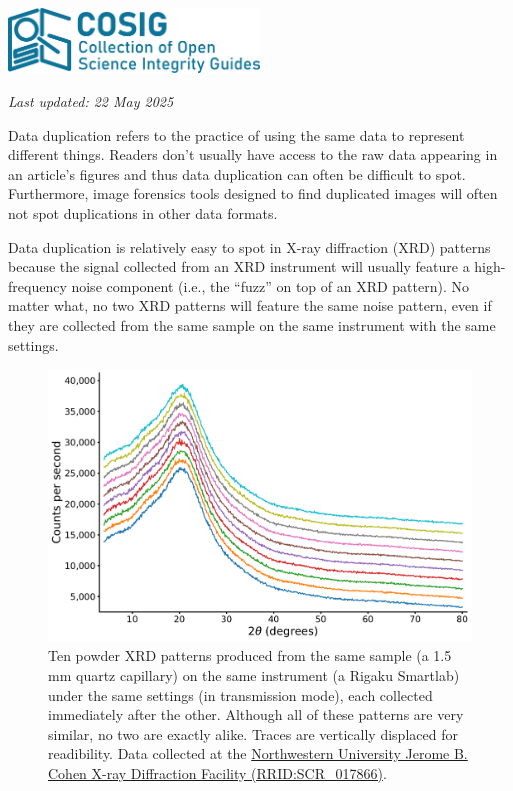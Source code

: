 \documentclass[letterpaper, 12pt]{article}
\begin{document}
\flushleft\includegraphics[width=0.5\textwidth]{img/home/241017_final_logo_mockup.png}

\textit{Last updated: 22 May 2025}

Data duplication refers to the practice of using the same data to represent different things. Readers don't usually have access to the raw data appearing in an article's figures and thus data duplication can often be difficult to spot. Furthermore, image forensics tools designed to find duplicated images will often not spot duplications in other data formats.

Data duplication is relatively easy to spot in X-ray diffraction (XRD) patterns because the signal collected from an XRD instrument will usually feature a high-frequency noise component (i.e., the ``fuzz'' on top of an XRD pattern). No matter what, no two XRD patterns will feature the same noise pattern, even if they are collected from the same sample on the same instrument with the same settings.

\begin{figure}[h!tbp]
    \centering
    \includegraphics[width=\textwidth]{img/xrd_data_duplication/250519_xrd_x10.pdf}
    \caption*{Ten powder XRD patterns produced from the same sample (a 1.5 mm quartz capillary) on the same instrument (a Rigaku Smartlab) under the same settings (in transmission mode), each collected immediately after the other. Although all of these patterns are very similar, no two are exactly alike. Traces are vertically displaced for readibility. Data collected at the \href{https://www.xray.facilities.northwestern.edu/}{Northwestern University Jerome B. Cohen X-ray Diffraction Facility (RRID:SCR\_017866)}.}
\end{figure}
\end{document}
